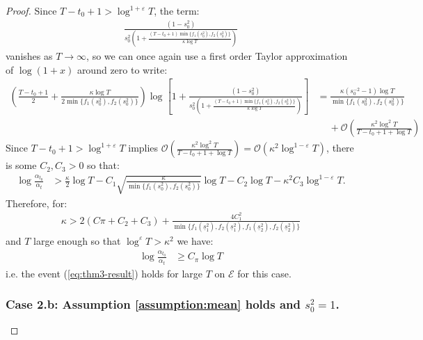 \begin{proof}
Since $T-t_0+1 > \log^{1+\varepsilon} T$, the term:
\begin{align*}
    \frac{(1 - s_0^2)}{s_0^{2}\left(1+ \frac{(T-t_0+1)\min\{f_1(s_0^2), f_2(s_0^2)\}}{\kappa \log T}\right)}
\end{align*}
vanishes as $T \to \infty$, so we can once again use a first order Taylor approximation of $\log(1+x)$ around zero to write:
\small
\begin{align*}
     \left(\frac{T - t_0 +1}{2} + \frac{\kappa \log T}{2\min\{f_1(s_0^2), f_2(s_0^2)\}}\right)\log\left[1 + \frac{(1 - s_0^2)}{s_0^{2}\left(1+ \frac{(T-t_0+1)\min\{f_1(s_0^2), f_2(s_0^2)\}}{\kappa \log T}\right)}\right]  &=  \frac{\kappa (s_0^{-2} -1) \log T}{\min\{f_1(s_0^2), f_2(s_0^2)\}} \\
     &\quad\: + \mathcal{O}\left(\frac{\kappa^2\log^2 T}{T-t_0+1 + \log T}\right)
\end{align*}
\normalsize
Since $T-t_0+1 > \log^{1+\varepsilon} T$ implies $\mathcal{O}\left(\frac{\kappa^2\log^2 T}{T-t_0+1 + \log T}\right) = \mathcal{O}(\kappa^2\log^{1-\varepsilon} T)$, there is some $C_2,C_3 > 0$ so that: 
\small
\begin{align*}
    \log \frac{\alpha_{t_0}}{\alpha_t} &> \frac{\kappa }{2}\log T- C_1\sqrt{\frac{\kappa}{\min\{f_1(s_0^2), f_2(s_0^2)\}}} \log T   - C_2\log T - \kappa^2C_3\log^{1-\varepsilon} T. 
\end{align*}
\normalsize
Therefore, for:
\begin{align*}
    \kappa > 2(C\pi + C_2 + C_3) + \frac{4C_1^2}{\min\{f_1(\underline{s}_1^2), f_2(\underline{s}_1^2),f_1(\underline{s}_2^2), f_2(\underline{s}_2^2)\}}
\end{align*}
and $T$ large enough so that $\log^{\varepsilon} T > \kappa^2 $ we have:
\begin{align*}
    \log \frac{\alpha_{t_0}}{\alpha_t} &\geq C_\pi \log T
\end{align*}
i.e. the event (\ref{eq:thm3-result}) holds for large $T$ on $\mathcal{E}$ for this case. 

\subsubsection*{Case 2.b: Assumption \ref{assumption:mean} holds and $s_0^2 =1$.}


\end{proof}
